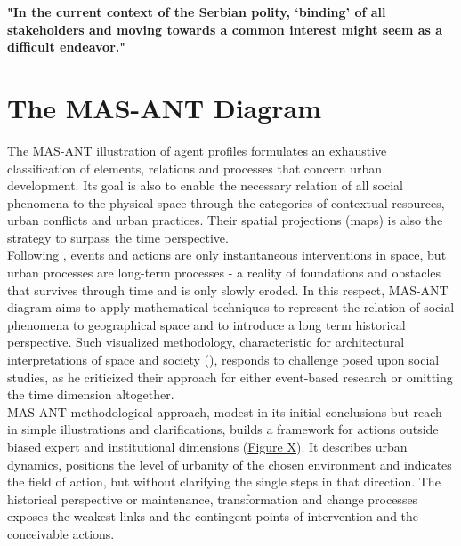 \documentclass[11pt]{report}
\begin{document}
{\textbf{"In the current context  of  the  Serbian  polity,  ‘binding’  of  all stakeholders  and  moving  towards  a  common interest  might  seem  as  a  difficult  endeavor."} \href{Volic}{\cite{volic_belgrade_2012}}



\section{The MAS-ANT Diagram}

The MAS-ANT illustration of agent profiles formulates an exhaustive classification of elements, relations and processes that concern urban development.
Its goal is also to enable the necessary relation of all social phenomena to the physical space through the categories of contextual resources, urban conflicts and urban practices.
Their spatial projections (maps) is also the strategy to surpass the time perspective.
\\

Following \href{Braudel}{\cite{braudel_history_1970}}, events and actions are only instantaneous interventions in space, but urban processes are long-term processes - a reality of foundations and obstacles that survives through time and is only slowly eroded.
In this respect, MAS-ANT diagram aims to apply mathematical  techniques to represent the  relation of social phenomena  to  geographical space and to introduce a  long term historical perspective.
Such visualized methodology, characteristic for architectural interpretations of space and society (\href{X}{\cite{????}}), responds to \href{Braudel}{\cite{braudel_history_1970}} challenge posed upon social studies, as he criticized their approach for either event-based research or omitting the time dimension altogether.
\\

MAS-ANT methodological approach, modest in its initial conclusions but reach in simple illustrations and clarifications, builds a framework for actions outside biased expert and institutional dimensions (\href{Diagram}{Figure X}).
It describes urban dynamics, positions the level of urbanity of the chosen environment and indicates the field of action, but without clarifying the single steps in that direction.
The historical perspective or maintenance, transformation and change processes exposes the weakest links and the contingent points of intervention and the conceivable actions. 
\\

}
\end{document}
